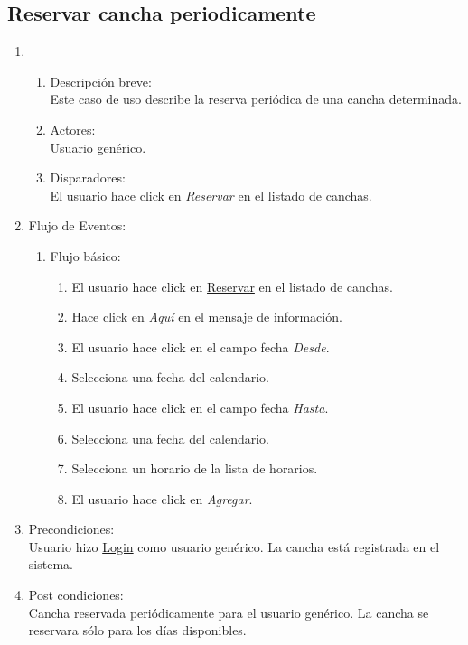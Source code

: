 \documentclass[a4paper,11pt]{article}
\begin{document}
\subsection{Reservar cancha periodicamente}
\begin{enumerate}

    \item
    \begin{enumerate}
    \item Descripci\'on breve: \\
        Este caso de uso describe la reserva peri\'odica de una cancha determinada.
    \item Actores: \\
        Usuario gen\'erico.
    \item Disparadores: \\
        El usuario hace click en \emph{Reservar} en el listado de canchas.
    \end{enumerate}

    \item Flujo de Eventos:

    \begin{enumerate}

        \item Flujo b\'asico:
		\begin{enumerate}
		\item	El usuario hace click en \underline{Reservar} en el listado de canchas.
		\item	Hace click en \emph{Aqu\'i} en el mensaje de informaci\'on.
		\item	El usuario hace click en el campo fecha \emph{Desde}.
		\item	Selecciona una fecha del calendario.
		\item	El usuario hace click en el campo fecha \emph{Hasta}.
		\item	Selecciona una fecha del calendario.
		\item	Selecciona un horario de la lista de horarios.
		\item	El usuario hace click en \emph{Agregar}.
		\end{enumerate}
	\end{enumerate}

    \item Precondiciones: \\
        Usuario hizo \underline{Login} como usuario gen\'erico.
        La cancha est\'a registrada en el sistema.

    \item Post condiciones: \\
        Cancha reservada peri\'odicamente para el usuario gen\'erico.
	La cancha se reservara s\'olo para los d\'ias disponibles.
\end{enumerate}
\end{document}
